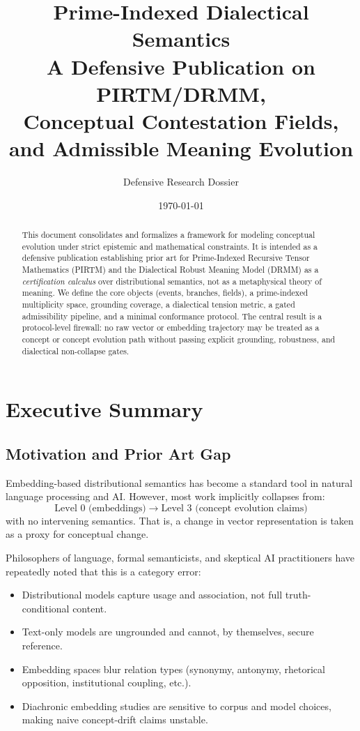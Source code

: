 \documentclass[11pt, a4paper]{article}
\title{Prime-Indexed Dialectical Semantics\\
A Defensive Publication on PIRTM/DRMM,\\
Conceptual Contestation Fields, and Admissible Meaning Evolution}
\author{Defensive Research Dossier}
\date{\today}
\begin{document}
\maketitle

\begin{abstract}
This document consolidates and formalizes a framework for modeling conceptual evolution under strict epistemic and mathematical constraints.
It is intended as a defensive publication establishing prior art for Prime-Indexed Recursive Tensor Mathematics (PIRTM) and the Dialectical Robust Meaning Model (DRMM) as a \emph{certification calculus} over distributional semantics, not as a metaphysical theory of meaning.
We define the core objects (events, branches, fields), a prime-indexed multiplicity space, grounding coverage, a dialectical tension metric, a gated admissibility pipeline, and a minimal conformance protocol.
The central result is a protocol-level firewall: no raw vector or embedding trajectory may be treated as a concept or concept evolution path without passing explicit grounding, robustness, and dialectical non-collapse gates.
\end{abstract}
\newpage
\tableofcontents
\newpage
\section{Executive Summary}

\subsection{Motivation and Prior Art Gap}

Embedding-based distributional semantics has become a standard tool in natural language processing and AI.
However, most work implicitly collapses from:
\[
\text{Level 0 (embeddings)} \;\longrightarrow\; \text{Level 3 (concept evolution claims)}
\]
with no intervening semantics.
That is, a change in vector representation is taken as a proxy for conceptual change.

Philosophers of language, formal semanticists, and skeptical AI practitioners have repeatedly noted that this is a category error:
\begin{itemize}[nosep]
  \item Distributional models capture usage and association, not full truth-conditional content.
  \item Text-only models are ungrounded and cannot, by themselves, secure reference.
  \item Embedding spaces blur relation types (synonymy, antonymy, rhetorical opposition, institutional coupling, etc.).
  \item Diachronic embedding studies are sensitive to corpus and model choices, making naive concept-drift claims unstable.
\end{itemize}
\end{document}
